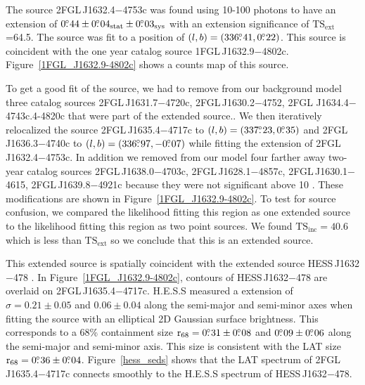 \documentclass[12pt,preprint]{aastex}
\newcommand{\gev}{\text{GeV}\xspace}
\newcommand{\tev}{\text{TeV}\xspace}
\newcommand{\tsext}{{\ensuremath{\text{TS}_{\text{ext}}}}\xspace}
\newcommand{\tsinc}{\ensuremath{\text{TS}_{\text{inc}}}\xspace}
\newcommand{\rsixeight}{{\ensuremath{\text{r}_{68}}}\xspace}
\newcommand{\sys}{\text{sys}\xspace}
\newcommand{\stat}{\text{stat}\xspace}
\begin{document}
The source 2FGL\,J1632.4$-$4753c was found 
using 10-100 \gev photons to
have an extension of $0\fdg44\pm0\fdg04_\stat\pm0\fdg03_\sys$ 
with an extension
significance of \tsext=64.5.  The source was fit to a position of
$(l,b)=(336\mbox{$.\!\!^\circ$}41,0\mbox{$.\!\!^\circ$}22)$.  This source is coincident with the one
year catalog source 1FGL\,J1632.9$-$4802c.  Figure~\ref{1FGL_J1632.9-4802c}
shows a counts map of this source.

To get a good fit of the source, we had to remove from our background model
three catalog sources 2FGL\,J1631.7$-$4720c, 2FGL\,J1630.2$-$4752,
2FGL J1634.4$-$4743c.4-4820c that were part of the extended source..
We then iteratively relocalized the source 2FGL\,J1635.4$-$4717c
to $(l,b)=(337\mbox{$.\!\!^\circ$}23,0\mbox{$.\!\!^\circ$}35)$ and 2FGL\,J1636.3$-$4740c to
$(l,b)=(336\mbox{$.\!\!^\circ$}97,-0\mbox{$.\!\!^\circ$}07)$ while fitting the extension of
2FGL\,J1632.4$-$4753c.  In addition we removed from our model four
farther away two-year catalog sources 2FGL\,J1638.0$-$4703c, 
2FGL\,J1628.1$-$4857c, 2FGL\,J1630.1$-$4615, 2FGL\,J1639.8$-$4921c because they
were not significant above 10 \gev.  These modifications are shown
in Figure~\ref{1FGL_J1632.9-4802c}.  To test for source confusion,
we compared the likelihood fitting this region as one extended source
to the likelihood fitting this region as two point sources. We found
$\tsinc=40.6$ which is less than \tsext so we conclude
that this is an extended source.

This extended source is spatially coincident with the extended
\tev source HESS\,J1632$-$478 \citep{hess_plane_survey}.
In Figure~\ref{1FGL_J1632.9-4802c}, contours of  HESS\,J1632$-$478
are overlaid on 2FGL\,J1635.4$-$4717c.  H.E.S.S measured a 
extension of $\sigma=0.21\pm0.05$ and $0.06\pm0.04$ along the
semi-major and semi-minor axes when fitting the source with an
elliptical 2D Gaussian surface brightness.  This corresponds to a 68\%
containment size $\rsixeight=0\fdg31\pm0\fdg08$ and $0\mbox{$.\!\!^\circ$}09\pm0\mbox{$.\!\!^\circ$}06$
along the semi-major and semi-minor axis. This size is consistent with
the LAT size $\rsixeight=0\fdg36\pm0\fdg04$.  Figure~\ref{hess_seds}
shows that the LAT spectrum of 2FGL\,J1635.4$-$4717c connects smoothly to
the H.E.S.S spectrum of HESS\,J1632$-$478.
\end{document}
